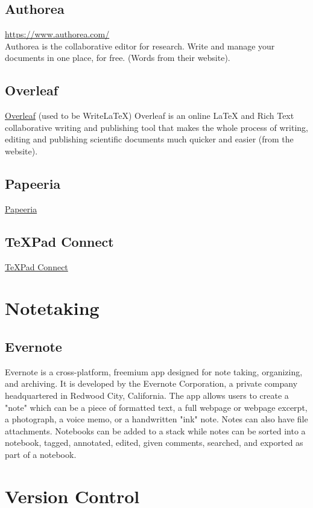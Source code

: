 \documentclass{article}
\begin{document}
\subsection{Authorea}
\href{https://www.authorea.com/}{https://www.authorea.com/}\\
Authorea is the collaborative editor for research. Write and manage your documents in one place, for free. (Words from their website).

\subsection{Overleaf}
\href{https://www.overleaf.com/}{Overleaf} (used to be WriteLaTeX) 
Overleaf is an online LaTeX and Rich Text collaborative writing and publishing tool that makes the whole process of writing, editing and publishing scientific documents much quicker and easier (from the website). 

\subsection{Papeeria}
\href{https://www.papeeria.com/landing}{Papeeria} 

\subsection{TeXPad Connect}
\href{https://www.texpadapp.com/texpad-connect}{TeXPad Connect}



\section{Notetaking}
\subsection{Evernote}
Evernote is a cross-platform, freemium app designed for note taking, organizing, and archiving. It is developed by the Evernote Corporation, a private company headquartered in Redwood City, California. The app allows users to create a "note" which can be a piece of formatted text, a full webpage or webpage excerpt, a photograph, a voice memo, or a handwritten "ink" note. Notes can also have file attachments. Notebooks can be added to a stack while notes can be sorted into a notebook, tagged, annotated, edited, given comments, searched, and exported as part of a notebook.

\section{Version Control}
\end{document}
